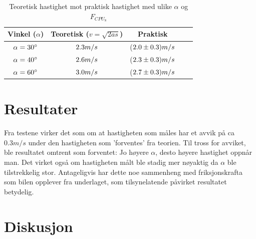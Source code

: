 \documentclass[11pt, a4paper]{report}
\begin{document}
\begin{table}[h]
\caption{Teoretisk hastighet mot praktisk hastighet med ulike $\alpha$ og $F_{CPU_{8}}$}
\begin{center}
\begin{tabular}{ccccc}
\hline
Vinkel ($\alpha$)  & Teoretisk ($ v =\sqrt{2as}$) &  Praktisk\\
\hline

$\alpha = 30^{\circ}\rm$ & $2.3 m/s\rm$ & ($2.0 \pm 0.3) m/s \rm$\\

$\alpha = 40^{\circ}\rm$ & $2.6 m/s\rm $& ($2.3 \pm 0.3) m/s \rm $ \\

$\alpha = 60^{\circ}\rm$ & $3.0 m/s\rm $& ($2.7\pm 0.3) m/s \rm $ \\

\hline

\end{tabular}
\end{center}
\end{table}




\section{Resultater}

Fra testene virker det som om at hastigheten som måles har et avvik på ca $0.3 m/s$ under den hastigheten som 'forventes' fra teorien. Til tross for avviket, ble resultatet omtrent som forventet: Jo høyere $\alpha$, desto høyere hastighet oppnår man. Det virket også om hastigheten målt ble stadig mer nøyaktig da $\alpha$ ble tilstrekkelig stor. Antageligvis har dette noe sammenheng med friksjonskrafta som bilen opplever fra underlaget, som tilsynelatende påvirket resultatet betydelig.
 
\section{Diskusjon}
\end{document}
